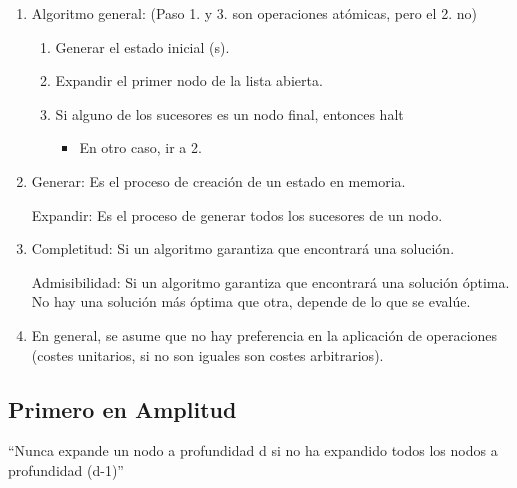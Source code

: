 \documentclass[12pt, twoside, openright]{report} %
\begin{document}
\begin{enumerate}
	\item Algoritmo general: (Paso 1. y 3. son operaciones atómicas, pero el
	      2. no)

	      \begin{enumerate}
		      \item Generar el estado inicial (s).
		      \item Expandir el primer nodo de la lista abierta.
		      \item Si alguno de los sucesores es un nodo final, entonces halt

		            \begin{itemize}
			            \item En otro caso, ir a 2.
		            \end{itemize}
	      \end{enumerate}
	\item Generar: Es el proceso de creación de un estado en memoria.

	      Expandir: Es el proceso de generar todos los sucesores de un nodo.
	\item Completitud: Si un algoritmo garantiza que encontrará una solución.

	      Admisibilidad: Si un algoritmo garantiza que encontrará una solución
	      óptima. No hay una solución más óptima que otra, depende de lo que
	      se evalúe.
	\item En general, se asume que no hay preferencia en la aplicación de
	      operaciones (costes unitarios, si no son iguales son costes
	      arbitrarios).
\end{enumerate}
\subsection{Primero en Amplitud}

``Nunca expande un nodo a profundidad d si no ha expandido todos los
nodos a profundidad (d-1)''
\end{document}
